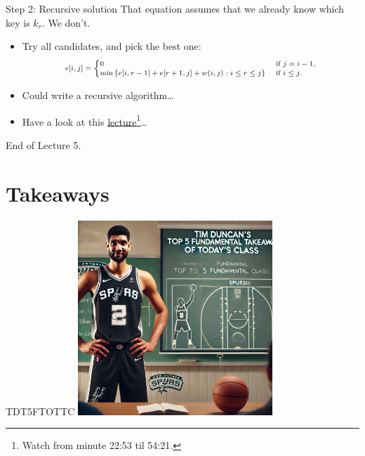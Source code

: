 \documentclass[aspectratio=169]{beamer}
\begin{document}
\begin{frame}{Step 2: Recursive solution}
    That equation assumes that we already know which key is $k_r$.  We don’t.
    \begin{itemize}
        \item Try all candidates, and pick the best one:
            \begin{equation*}
                \scriptsize
                \begin{align*}
                    e[i, j] =
                        \begin{cases}
                            0 & \text{ if } j = i - 1 \text{,} \\
                            \min \left \{ e[i, r-1] + e[r+1, j] + w(i, j):i \leq r \leq j \right \} & \text{ if } i \leq j \text{.}
                        \end{cases}
                \end{align*}
            \end{equation*}
        \item Could write a recursive algorithm\ldots
        \item Have a look at this \href{https://www.youtube.com/watch?v=Tw1k46ywN6E}{lecture}\footnote{Watch from minute 22:53 til 54:21.}\ldots
    \end{itemize}
\end{frame}


\begin{frame}{}
    \centering
    \Huge End of Lecture 5.
\end{frame}

\section*{Takeaways}

\begin{frame}{TDT5FTOTTC}
    \centering
    \includegraphics[width=0.55\textwidth]{figures/tim.png}
\end{frame}
\end{document}
